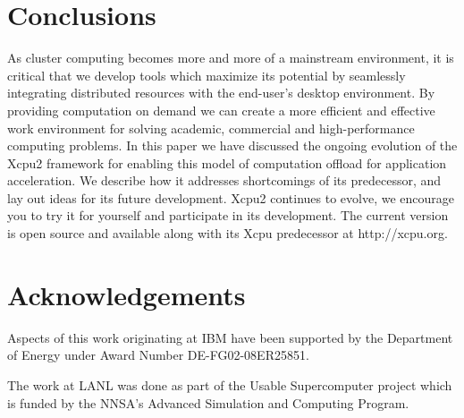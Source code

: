 \section{Conclusions}

As cluster computing becomes more and more of a mainstream environment, it
is critical that we develop tools which maximize its potential by seamlessly
integrating distributed resources with the end-user's desktop environment.
By providing computation on demand we can create a more efficient and effective
work environment for solving academic, commercial and high-performance 
computing problems.
In this paper we have discussed the ongoing evolution of the Xcpu2 
framework for enabling this model of computation offload for application
acceleration.  We describe how it addresses shortcomings of its predecessor,
and lay out ideas for its future development.
Xcpu2 continues to evolve, we encourage you to try it for yourself and
participate in its development.  The current version is open source and
available along with its Xcpu predecessor at http://xcpu.org.

\section*{Acknowledgements}

Aspects of this work originating at IBM have been supported by the
Department of Energy under Award Number DE-FG02-08ER25851.

The work at LANL was done as part of the Usable Supercomputer project which
is funded by the NNSA's Advanced Simulation and Computing Program.
